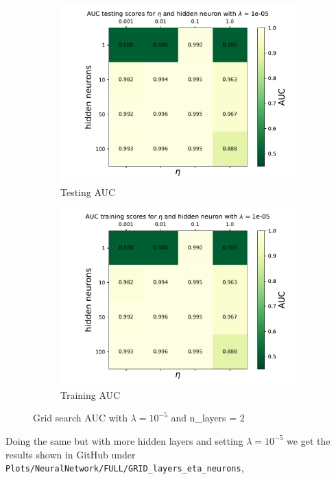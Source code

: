 \documentclass[14pt, a4paper]{book}
\begin{document}
\begin{figure}[!ht]
	\centering
	\begin{subfigure}[b]{0.49\textwidth}
        \centering
        \includegraphics[width=1\textwidth]{testing_ne.pdf}
        \caption{Testing AUC}
     \end{subfigure}
     \hfill
     \begin{subfigure}[b]{0.49\textwidth}
        \centering
        \includegraphics[width=1\textwidth]{training_ne.pdf}
        \caption{Training AUC}
     \end{subfigure}
     \caption{Grid search AUC with $\lambda=10^{-5}$ and n\_layers = 2}\label{fig:NN_GRID_AUC}
\end{figure}
\newpage\noindent Doing the same but with more hidden layers and setting $\lambda=10^{-5}$ we get the results shown in GitHub under \verb|Plots/NeuralNetwork/FULL/GRID_layers_eta_neurons|, 
\end{document}
